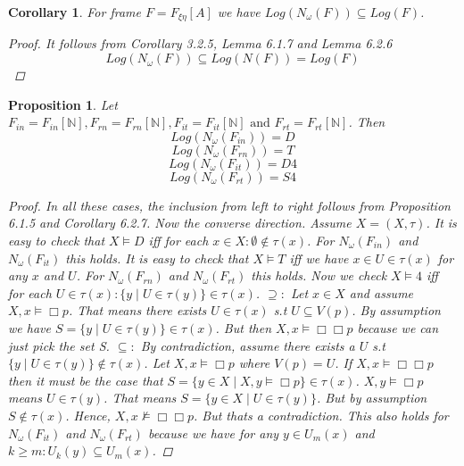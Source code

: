 \documentclass[12pt, a4paper]{scrartcl}
\newtheorem{proposition}[definition]{Proposition}
\newtheorem{corollary}[definition]{Corollary}
\begin{document}
\begin{corollary}
    For frame $F = F_{\xi \eta}[A]$ we have $Log(N_\omega(F)) \subseteq Log(F)$.
    \begin{proof}
        It follows from Corollary 3.2.5, Lemma 6.1.7 and Lemma 6.2.6 
        $$Log(N_\omega(F)) \subseteq Log(N(F)) = Log(F)$$
    \end{proof}

\end{corollary}

\begin{proposition}
    Let $F_{in} = F_{in}[\mathbb{N}], F_{rn} = F_{rn}[\mathbb{N}], F_{it} = F_{it}[\mathbb{N}] \mbox{ and } F_{rt} = F_{rt}[\mathbb{N}]$. Then
    $$Log(N_\omega(F_{in})) = D$$
    $$Log(N_\omega(F_{rn})) = T$$
    $$Log(N_\omega(F_{it})) = D4$$
    $$Log(N_\omega(F_{rt})) = S4$$

    \begin{proof}
        In all these cases, the inclusion from left to right follows from Proposition 6.1.5 and Corollary 6.2.7.
        Now the converse direction. Assume $X =(X,\tau)$. \newline
        It is easy to check that $X \vDash D$ iff for each $x \in X : \emptyset \notin \tau(x)$. For $N_\omega(F_{in})$ and $N_\omega(F_{it})$ this holds. \newline
        It is easy to check that $X \vDash T$ iff we have $x\in U \in \tau(x)$ for any $x$ and $U$. For $N_\omega(F_{rn})$ and $N_\omega(F_{rt})$ this holds. \newline
        Now we check $X \vDash 4$ iff for each $U \in \tau(x) : \{y \mid U \in \tau(y)\} \in \tau(x)$. \newline
        $\supseteq : $ Let $x \in X$ and assume $X,x \vDash \Box p$. That means there exists $U \in \tau(x)$ s.t $U\subseteq V(p)$.
        By assumption we have $S = \{y \mid U \in \tau(y)\} \in \tau(x)$. But then $X,x \vDash \Box\Box p$ because we can just pick the set S. \newline
        $\subseteq :$ By contradiction, assume there exists a $U$ s.t $\{y \mid U \in \tau(y)\} \notin \tau(x)$. Let $X,x \vDash \Box p$ where $V(p) = U$.
        If $X,x \vDash \Box\Box p$ then it must be the case that  \newline 
        $S =\{y \in X \mid X,y \vDash \Box p\} \in \tau(x)$. $X,y \vDash \Box p$ means $U \in \tau(y)$. That means $S = \{y \in X \mid U \in \tau(y)\}$. But by assumption $S \notin \tau(x)$. 
        Hence, $X,x \not\vDash \Box\Box p$. But thats a contradiction. This also holds for $N_\omega(F_{it})$ and $N_\omega(F_{rt})$ because we have for any $y \in U_m(x)$ and 
        $k \geq m : U_k(y) \subseteq U_m(x)$.
            
    \end{proof}
\end{proposition}
\end{document}

